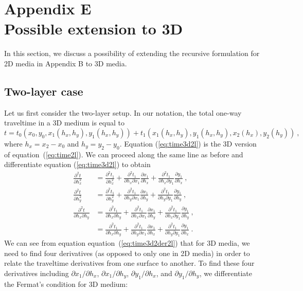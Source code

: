 \section{Appendix E \\ Possible extension to 3D}
In this section, we discuss a possibility of extending the recursive formulation for 2D media in Appendix B to 3D media.

\subsection{Two-layer case}
Let us first consider the two-layer setup. In our notation, the total one-way traveltime in a 3D medium is equal to
\begin{equation}
\label{eq:time3d2l}
t = t_0(x_0,y_0,x_1(h_x,h_y),y_1(h_x,h_y)) + t_1(x_1(h_x,h_y),y_1(h_x,h_y),x_2(h_x),y_2(h_y))~, 
\end{equation}
where $h_x = x_2-x_0$ and $h_y = y_2-y_0$. Equation (\ref{eq:time3d2l}) is the 3D version of equation~(\ref{eq:time2l}). We can proceed along the same line as before and differentiate equation (\ref{eq:time3d2l}) to obtain
\begin{align}
\label{eq:time3d2der2l}
\frac{\partial^2 t}{\partial h_x^2} & =  \frac{\partial^2 t_1}{\partial h_x^2} +
    \frac{\partial^2 t_1}{\partial h_x\partial x_1} \frac{\partial x_1}{\partial h_x} +
    \frac{\partial^2 t_1}{\partial h_x\partial y_1} \frac{\partial y_1}{\partial h_x}~,\\ \nonumber
\frac{\partial^2 t}{\partial h_y^2} & =  \frac{\partial^2 t_1}{\partial h_y^2} +
    \frac{\partial^2 t_1}{\partial h_y\partial x_1} \frac{\partial x_1}{\partial h_y} +
    \frac{\partial^2 t_1}{\partial h_y\partial y_1} \frac{\partial y_1}{\partial h_y}~,\\ \nonumber
\frac{\partial^2 t}{\partial h_x \partial h_y} & =  \frac{\partial^2 t_1}{\partial h_x\partial h_y} +
    \frac{\partial^2 t_1}{\partial h_x \partial x_1} \frac{\partial x_1}{\partial h_y} +
    \frac{\partial^2 t_1}{\partial h_x \partial y_1} \frac{\partial y_1}{\partial h_y}~,\\ \nonumber
    & =  \frac{\partial^2 t_1}{\partial h_x\partial h_y} +
    \frac{\partial^2 t_1}{\partial h_y \partial x_1} \frac{\partial x_1}{\partial h_x} +
    \frac{\partial^2 t_1}{\partial h_y \partial y_1} \frac{\partial y_1}{\partial h_x}~.
\end{align}
We can see from equation equation~(\ref{eq:time3d2der2l}) that for 3D media, we need to find four derivatives (as opposed to only one in 2D media) in order to relate the traveltime derivatives from one surface to another. To find these four derivatives including $\partial x_1/\partial h_x$, $\partial x_1/\partial h_y$, $\partial y_1/\partial h_x$, and $\partial y_1/\partial h_y$, we differentiate the Fermat's condition for 3D medium:
